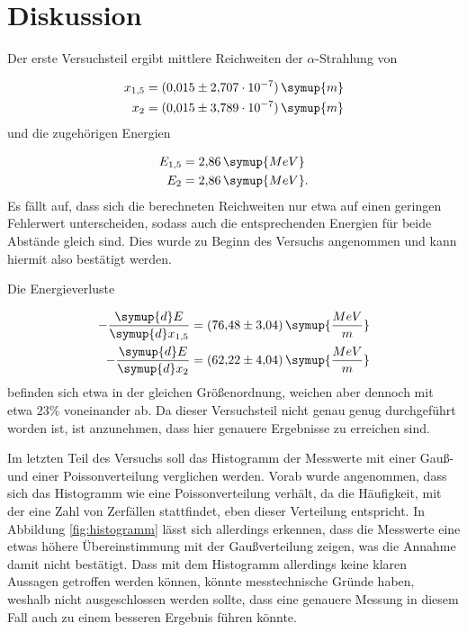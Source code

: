 \section{Diskussion}

Der erste Versuchsteil ergibt mittlere Reichweiten der $\alpha$-Strahlung von

\begin{equation*}
\begin{aligned}
x_{1{,}5} &= (0{,}015 \pm 2{,}707\cdot 10^{-7})\,\symup{m}\\
x_{2}  &= (0{,}015 \pm 3{,}789\cdot 10^{-7})\,\symup{m}\\
\end{aligned}
\end{equation*}
und die zugehörigen Energien

\begin{equation*}
\begin{aligned}
E_{\text{1{,}5}} &= 2{,}86\,\symup{MeV} \\
E_{\text{2}} &= 2{,}86\,\symup{MeV}. \\
\end{aligned}
\end{equation*}
Es fällt auf, dass sich die berechneten Reichweiten nur etwa auf einen geringen Fehlerwert unterscheiden, sodass auch die entsprechenden Energien für beide Abstände gleich sind.
Dies wurde zu Beginn des Versuchs angenommen und kann hiermit also bestätigt werden.

Die Energieverluste

\begin{equation*}
\begin{aligned}
-\frac{\symup{d}E}{\symup{d}x_{1{,}5}} &= (76{,}48 \pm 3{,}04)\,\symup{\frac{MeV}{m}} \\
-\frac{\symup{d}E}{\symup{d}x_2} &= (62{,}22 \pm 4{,}04)\,\symup{\frac{MeV}{m}} \\
\end{aligned}
\end{equation*}
befinden sich etwa in der gleichen Größenordnung, weichen aber dennoch mit etwa $23\%$ voneinander ab. Da dieser Versuchsteil nicht genau genug durchgeführt worden ist, ist anzunehmen, dass hier genauere 
Ergebnisse zu erreichen sind.

Im letzten Teil des Versuchs soll das Histogramm der Messwerte mit einer Gauß- und einer Poissonverteilung verglichen werden. Vorab wurde angenommen, dass sich das Histogramm wie eine Poissonverteilung verhält,
da die Häufigkeit, mit der eine Zahl von Zerfällen stattfindet, eben dieser Verteilung entspricht.
In Abbildung \ref{fig:histogramm} lässt sich allerdings erkennen, dass die Messwerte eine etwas höhere Übereinstimmung mit der Gaußverteilung zeigen, was die Annahme damit nicht bestätigt. Dass mit dem Histogramm allerdings
keine klaren Aussagen getroffen werden können, könnte messtechnische Gründe haben, weshalb nicht ausgeschlossen werden sollte, dass eine genauere Messung in diesem Fall auch zu einem besseren Ergebnis führen könnte.